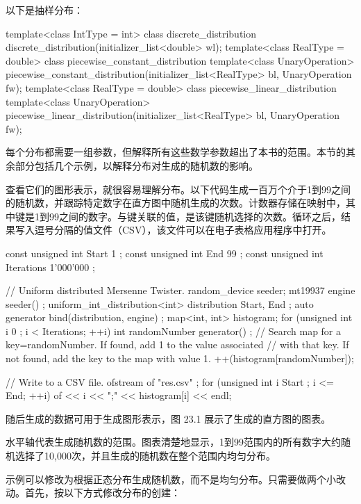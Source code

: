 以下是抽样分布：

\begin{cpp}
template<class IntType = int> class discrete_distribution
    discrete_distribution(initializer_list<double> wl);
template<class RealType = double> class piecewise_constant_distribution
    template<class UnaryOperation>
        piecewise_constant_distribution(initializer_list<RealType> bl,
            UnaryOperation fw);
template<class RealType = double> class piecewise_linear_distribution
    template<class UnaryOperation>
        piecewise_linear_distribution(initializer_list<RealType> bl,
            UnaryOperation fw);
\end{cpp}

每个分布都需要一组参数，但解释所有这些数学参数超出了本书的范围。本节的其余部分包括几个示例，以解释分布对生成的随机数的影响。

查看它们的图形表示，就很容易理解分布。以下代码生成一百万个介于1到99之间的随机数，并跟踪特定数字在直方图中随机生成的次数。计数器存储在映射中，其中键是1到99之间的数字。与键关联的值，是该键随机选择的次数。循环之后，结果写入逗号分隔的值文件（CSV），该文件可以在电子表格应用程序中打开。

\begin{cpp}
const unsigned int Start { 1 };
const unsigned int End { 99 };
const unsigned int Iterations { 1'000'000 };

// Uniform distributed Mersenne Twister.
random_device seeder;
mt19937 engine { seeder() };
uniform_int_distribution<int> distribution { Start, End };
auto generator { bind(distribution, engine) };
map<int, int> histogram;
for (unsigned int i { 0 }; i < Iterations; ++i) {
    int randomNumber { generator() };
    // Search map for a key=randomNumber. If found, add 1 to the value associated
    // with that key. If not found, add the key to the map with value 1.
    ++(histogram[randomNumber]);
}

// Write to a CSV file.
ofstream of { "res.csv" };
for (unsigned int i { Start }; i <= End; ++i) {
    of << i << ";" << histogram[i] << endl;
}
\end{cpp}

随后生成的数据可用于生成图形表示，图 23.1 展示了生成的直方图的图表。

水平轴代表生成随机数的范围。图表清楚地显示，1到99范围内的所有数字大约随机选择了10,000次，并且生成的随机数在整个范围内均匀分布。


示例可以修改为根据正态分布生成随机数，而不是均匀分布。只需要做两个小改动。首先，按以下方式修改分布的创建：

